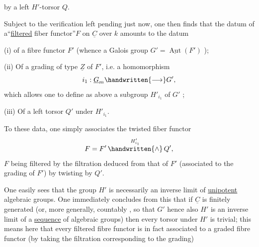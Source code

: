 %
by a left $H'$-torsor $Q$.

Subject to the verification left pending just now, one then finds that the datum of a``\uline{filtered} fiber functor''$F$ on $\underline{C}$ over $k$ amounts to the datum

(i) of a fibre functor $F'$  (whence a Galois group $G'=\underline{\operatorname{Aut}}(F')$ );

(ii) Of a grading of type $\underline{Z}$ of $F'$, i.e. a homomorphism
\[
i_1:\underline{G}_m\handwritten{\longrightarrow}G',
\]
which allows one to define as above a subgroup $H'_{i_1}$ of $G'$ ;

(iii) Of a left torsor $Q'$ under $H'_{i_1}$.

To these data, one simply associates the twisted fiber functor
\[
F=F'\mathop{\handwritten{\wedge}}\limits^{H'_{i_1}}Q',
\]
$F$ being filtered by the filtration deduced from that of $F'$  (associated to the grading of $F'$) by twisting by $Q'$.


One easily sees that the group $H'$ is necessarily an inverse limit of \uline{unipotent} algebraic groups. One immediately concludes from this that if $\underline{C}$ is finitely generated (or, more generally, countably , so that $G'$  hence also $H'$ is an inverse limit of a \uline{sequence} of algebraic groups) then every torsor under $H'$ is trivial; this means here that every filtered fibre functor is in fact associated to a graded fibre functor (by taking the filtration corresponding to the grading)
